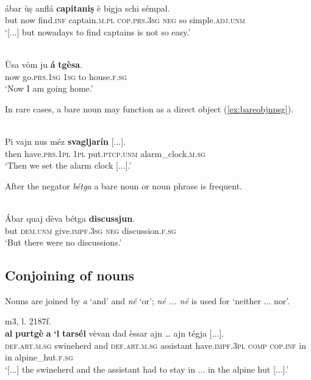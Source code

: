 \ea
\label{ex:bareindefpl}
\\
	\gll [...] ábar ùṣ anflá \textbf{capitaniṣ} è bigja schi sémpal.\\
{} but now find.\textsc{inf} captain.\textsc{m.pl} \textsc{cop.prs.3sg} \textsc{neg} so simple.\textsc{adj.unm}\\
\glt `[...] but nowadays to find captains is not so easy.'
\z

\ea
\label{ex:barepp1}
\\
\gll Ùsa vòm ju \textbf{á} \textbf{tgèsa}.\\
now go.\textsc{prs.1sg} \textsc{1sg} to house.\textsc{f.sg}\\
\glt `Now I am going home.'
\z

In rare cases, a bare noun may function as a direct object (\ref{ex:bareobjnpsg}).

\ea
\label{ex:bareobjnpsg}
\\
\gll Pi vajn nus méz \textbf{svagljarín} [...].\\
then have.\textsc{prs.1pl} \textsc{1pl} put.\textsc{ptcp.unm} alarm\_clock.\textsc{m.sg}\\
\glt `Then we set the alarm clock [...].'
\z

After the negator \textit{bétga} a bare noun or noun phrase is frequent.

\ea

\\
	\gll Ábar quaj dèva bétga \textbf{discussjun}.\\
but \textsc{dem.unm} give.\textsc{impf.3sg} \textsc{neg} discussion.\textsc{f.sg}\\
\glt `But there were no discussions.'
\z

\subsection{Conjoining of nouns}
Nouns are joined by \textit{a} `and' and \textit{né} `or'; \textit{né ... né} is used for `neither ... nor'.

\ea

 {m3, l. 2187f.}\\
\gll  [...] \textbf{al}  \textbf{purtgè} \textbf{a} \textbf{‘l} \textbf{tarsél} vèvan dad èssar ajn … ajn tégja [...].\\
 {} \textsc{def.art.m.sg} swineherd and \textsc{def.art.m.sg} assistant have.\textsc{impf.3pl} \textsc{comp} \textsc{cop.inf} in {} in alpine\_hut.\textsc{f.sg} \\
\glt `[...] the swineherd and the assistant had to stay in ... in the alpine hut [...].'
\z

